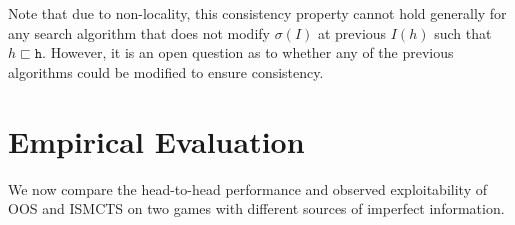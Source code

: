 \documentclass[letterpaper]{article}
\newcommand{\tth}{\mathtt{h}}
\newcounter{mlNoteCounter}
\newcommand{\mlnote}[1]{{\scriptsize \color{darkgreen} $\blacksquare$ \refstepcounter{mlNoteCounter}\textsf{[ML]$_{\arabic{mlNoteCounter}}$:{#1}}}}
\begin{document}
Note that due to non-locality, this consistency property cannot hold generally for any search 
algorithm that does not modify $\sigma(I)$ at previous $I(h)$ such that $h \sqsubset \tth$. However, 
it is an open question as to whether any of the previous algorithms could be modified to ensure 
consistency.

\section{Empirical Evaluation}


%

We now compare the head-to-head performance and observed exploitability 
of OOS and ISMCTS on two games with different sources of imperfect information. 
\end{document}
